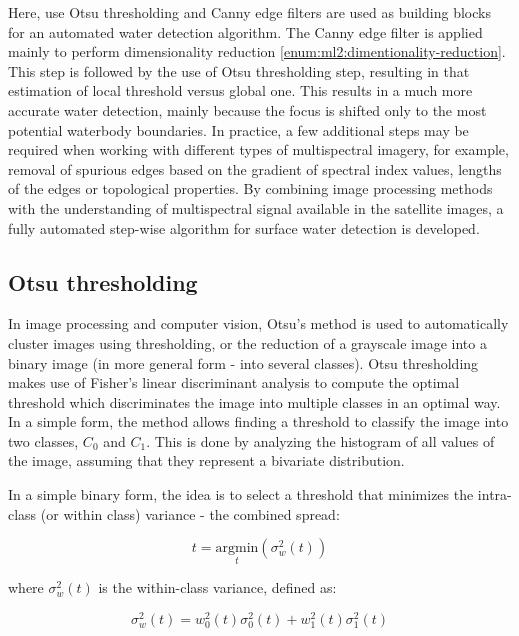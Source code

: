 Here, use Otsu thresholding and Canny edge filters are used as building blocks for an automated water detection algorithm. The Canny edge filter is applied mainly to perform dimensionality reduction \ref{enum:ml2:dimentionality-reduction}. This step is followed by the use of Otsu thresholding step, resulting in that estimation of local threshold versus global one. This results in a much more accurate water detection, mainly because the focus is shifted only to the most potential waterbody boundaries. In practice, a few additional steps may be required when working with different types of multispectral imagery, for example, removal of spurious edges based on the gradient of spectral index values, lengths of the edges or topological properties. By combining image processing methods with the understanding of multispectral signal available in the satellite images, a fully automated step-wise algorithm for surface water detection is developed.

\subsection{Otsu thresholding}
In image processing and computer vision, Otsu's method \citet{otsu1975threshold} is used to automatically cluster images using thresholding, or the reduction of a grayscale image into a binary image (in more general form - into several classes). Otsu thresholding makes use of Fisher's linear discriminant analysis \citet{fisher1936use} to compute the optimal threshold which discriminates the image into multiple classes in an optimal way. In a simple form, the method allows finding a threshold to classify the image into two classes, $C_0$ and $C_1$. This is done by analyzing the histogram of all values of the image, assuming that they represent a bivariate distribution. 

In a simple binary form, the idea is to select a threshold that minimizes the intra-class (or within class) variance - the combined spread:

\begin{equation}
t = \underset{t}{\mathrm{argmin}}\left(\sigma_w^2(t)\right)
\label{eq:otsu-withinclass}
\end{equation}

where $\sigma_w^2(t)$ is the within-class variance, defined as:

\begin{equation}
\sigma_w^2(t) = w_0^2(t) \sigma_0^2(t) + w_1^2(t) \sigma_1^2(t)
\end{equation}


